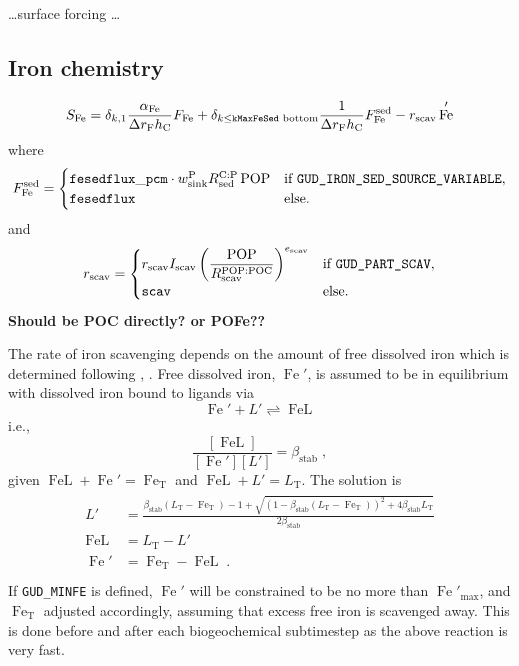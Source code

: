 \documentclass[11pt,letterpaper,english]{article}
\newcommand{\lxr}[1]{{\tt #1}}
\DeclareMathOperator{\Fe}{Fe}
\DeclareMathOperator{\FeL}{FeL}
\DeclareMathOperator{\POP}{POP}
\DeclareMathOperator{\POC}{POC}
\newcommand{\F}{\mathrm{F}}
\newcommand{\C}{\mathrm{C}}
\renewcommand{\P}{\mathrm{P}}
\newcommand{\total}{{\mathrm{T}}}
\newcommand{\FeT}{\Fe_\total}
\newcommand{\Ltot}{L_\total}
\newcommand{\sed}{{\text{sed}}}
\newcommand{\stab}{\text{stab}}
\newcommand{\Lstab}{\beta_{\stab}}
\newcommand{\scav}{{\text{scav}}}
\newcommand{\sink}{{\text{sink}}}
\begin{document}
\dots surface forcing \dots



\subsection{Iron chemistry}

\[
  S_{\Fe} = \delta_{k,1} \frac{\alpha_{\Fe}}{\Delta r_\F h_\C} F_{\Fe}
          + \delta_{k\le{\tt kMaxFeSed}\text{ bottom}}
            \frac{1}{\Delta r_\F h_\C} F_{\Fe}^\sed
          - r_\scav \Fe'
\]
where
\[
  F_{\Fe}^\sed = \begin{cases}
    {\tt fesedflux\_pcm}\cdot w^\P_\sink R^{\C:\P}_\sed \POP
    & \text{if \tt GUD\_IRON\_SED\_SOURCE\_VARIABLE}, \\
    {\tt fesedflux}
    & \text{else.}
    \end{cases}
\]
and
\[
  r_\scav = \begin{cases}
    r_\scav I_\scav \left(\dfrac{\POP}{R^{\POP:\POC}_\scav}\right)^{e_\scav}
    & \text{if \tt GUD\_PART\_SCAV}, \\
    {\tt scav}
    & \text{else.}
    \end{cases}
\]
\textbf{Should be POC directly? or POFe??}


The rate of iron scavenging depends on the amount of free dissolved iron which
is determined following \cite{Parekh2004}, \cite{Dutkiewicz2005}.
Free dissolved iron, $\Fe'$, is assumed to be in equilibrium with dissolved iron
bound to ligands via
\[
  \Fe' + L' \rightleftharpoons \FeL
\]
i.e.,
\[
  \frac{[\FeL]}{[\Fe'][L']} = \Lstab
  \;,
\]
given $\FeL+\Fe'=\FeT$ and $\FeL+L'=\Ltot$.  The solution is
\begin{align*}
 \begin{split}
  L' &= \frac{ \Lstab (\Ltot - \FeT) - 1
             +\sqrt{(1 - \Lstab (\Ltot - \FeT))^2 + 4 \Lstab \Ltot}}
          {2 \Lstab}
    \\
  \FeL &= \Ltot - L' \\
  \Fe' &= \FeT - \FeL
  \;.
 \end{split}
  \\
\end{align*}
If \lxr{GUD\_MINFE} is defined, $\Fe'$ will be constrained to be no more than $\Fe'_{\max}$,
and $\FeT$ adjusted accordingly, assuming that excess free iron is scavenged away.
This is done before and after each biogeochemical subtimestep as the above reaction
is very fast.
\end{document}
